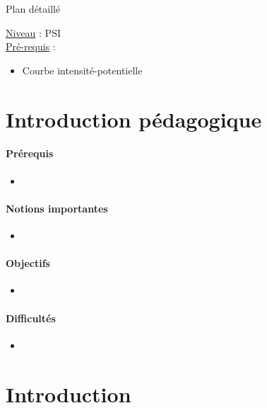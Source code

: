\begin{reportBlock}{Plan détaillé}

\underline{Niveau} : PSI \\

\underline{Pré-requis} :
\begin{itemize}
\item Courbe intensité-potentielle
\end{itemize}


\section*{Introduction pédagogique}



\paragraph*{Prérequis}
\begin{itemize}
\item 
\end{itemize}

\paragraph*{Notions importantes}

\begin{itemize}
\item
\end{itemize}

\paragraph*{Objectifs}

\begin{itemize}
\item
\end{itemize}

\paragraph*{Difficultés}

\begin{itemize}
\item 
\end{itemize}

\section*{Introduction}



\end{reportBlock}

